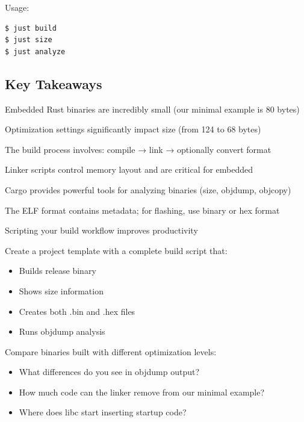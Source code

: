Usage:
\begin{verbatim}
$ just build
$ just size
$ just analyze
\end{verbatim}
\subsection{Key Takeaways}
\label{sec:ch1-key-takeaways}

\begin{keytakeaways}
    \item Embedded Rust binaries are incredibly small (our minimal example is 80 bytes)
    \item Optimization settings significantly impact size (from 124 to 68 bytes)
    \item The build process involves: compile → link → optionally convert format
    \item Linker scripts control memory layout and are critical for embedded
    \item Cargo provides powerful tools for analyzing binaries (size, objdump, objcopy)
    \item The ELF format contains metadata; for flashing, use binary or hex format
    \item Scripting your build workflow improves productivity
\end{keytakeaways}

\begin{exercise}[Easy]
    Create a project template with a complete build script that:
    \begin{itemize}
        \item Builds release binary
        \item Shows size information
        \item Creates both .bin and .hex files
        \item Runs objdump analysis
    \end{itemize}
\end{exercise}

\begin{exercise}[Medium]
    Compare binaries built with different optimization levels:
    \begin{itemize}
        \item What differences do you see in objdump output?
        \item How much code can the linker remove from our minimal example?
        \item Where does libc start inserting startup code?
    \end{itemize}
\end{exercise}

